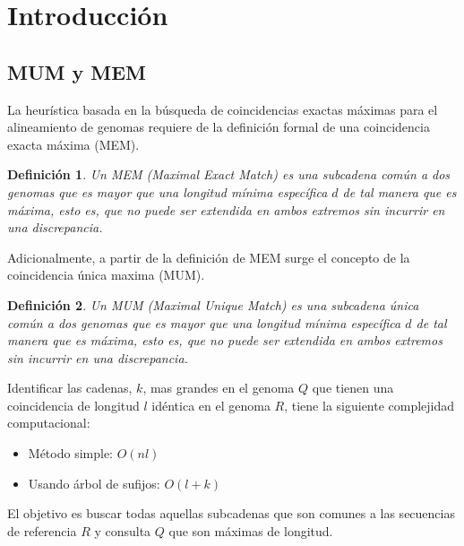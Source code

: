 \documentclass[12pt,a4paper]{article}
\newtheorem{mydef}{Definición}
\begin{document}
\section{Introducción}
\subsection{MUM y MEM}
\indent
La heurística basada en la búsqueda de coincidencias exactas máximas para el alineamiento de genomas requiere de la definición formal de una coincidencia exacta máxima (MEM).\\
\begin{mydef}Un MEM (Maximal Exact Match) es una subcadena común a dos
  genomas que es mayor que una longitud mínima específica $d$ de tal manera
  que es máxima, esto es, que no puede ser extendida en ambos extremos sin
  incurrir en una discrepancia. 
\end{mydef}
\indent
Adicionalmente, a partir de la definición de MEM surge el concepto de la coincidencia única maxima (MUM).\\
\begin{mydef}Un MUM (Maximal Unique Match) es una subcadena única común a dos genomas que es mayor que una longitud mínima específica $d$ de tal manera que es máxima, esto es, que no puede ser extendida en ambos extremos sin incurrir en una discrepancia.
\end{mydef}
Identificar las cadenas, $k$, mas grandes en el genoma $Q$ que tienen una coincidencia de longitud $l$ idéntica en el genoma $R$, tiene la siguiente complejidad computacional:
\begin{itemize}
  \item Método simple: $O(nl)$
  \item Usando árbol de sufijos: $O(l+k)$
\end{itemize}
\indent
El objetivo es buscar todas aquellas subcadenas que son comunes a las secuencias de referencia $R$ y consulta $Q$ que son máximas de longitud.\\
\end{document}
